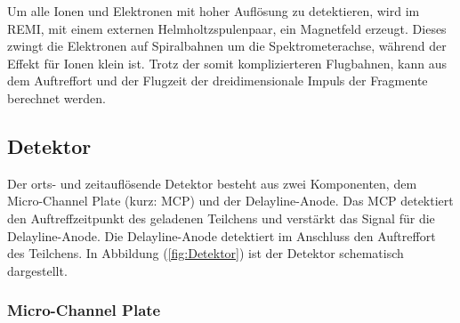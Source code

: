 Um alle Ionen und Elektronen mit hoher Auflösung zu detektieren, wird im REMI, mit einem externen Helmholtzspulenpaar, ein Magnetfeld erzeugt. Dieses zwingt die Elektronen auf Spiralbahnen um die Spektrometerachse, während der Effekt für Ionen klein ist. Trotz der somit komplizierteren Flugbahnen, kann aus dem Auftreffort und der Flugzeit der dreidimensionale Impuls der Fragmente berechnet werden. 

\subsection{Detektor} \label{sec:Detektor} 

Der orts- und zeitauflösende Detektor besteht aus zwei Komponenten, dem Micro-Channel Plate (kurz: MCP) und der Delayline-Anode. Das MCP detektiert den Auftreffzeitpunkt des geladenen Teilchens und verstärkt das Signal für die Delayline-Anode. Die Delayline-Anode detektiert im Anschluss den Auftreffort des Teilchens. In Abbildung (\ref{fig:Detektor}) ist der Detektor schematisch dargestellt.\\

\subsubsection{Micro-Channel Plate}

